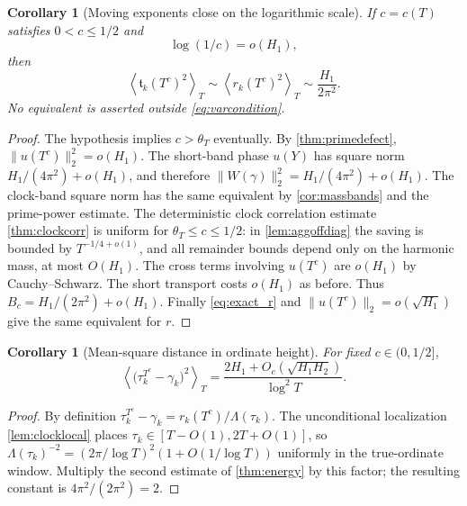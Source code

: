\documentclass[11pt,reqno]{amsart}
\numberwithin{equation}{section}
\newtheorem{corollary}[theorem]{Corollary}
\newcommand{\av}[1]{\left\langle #1\right\rangle_T}
\begin{document}
\begin{corollary}[Moving exponents close on the logarithmic scale]
\label{cor:varenergy}
If $c=c(T)$ satisfies $0<c\le1/2$ and
\begin{equation}\label{eq:varcondition}
\log(1/c)=o(H_1),
\end{equation}
then
\begin{equation}\label{eq:varenergy}
\av{\mathfrak t_k(T^c)^2}
\sim\av{r_k(T^c)^2}
\sim\frac{H_1}{2\pi^2}.
\end{equation}
No equivalent is asserted outside \eqref{eq:varcondition}.
\end{corollary}
\begin{proof}
The hypothesis implies $c>\theta_T$ eventually.
By \cref{thm:primedefect}, $\|u(T^c)\|_2^2=o(H_1)$.
The short-band phase $u(Y)$ has square norm
$H_1/(4\pi^2)+o(H_1)$, and therefore
$\|W(\gamma)\|_2^2=H_1/(4\pi^2)+o(H_1)$.
The clock-band square norm has the same equivalent by
\cref{cor:massbands} and the prime-power estimate.
The deterministic clock correlation estimate
\cref{thm:clockcorr} is uniform for $\theta_T\le c\le1/2$:
in \cref{lem:aggoffdiag} the saving is bounded by
$T^{-1/4+o(1)}$, and all remainder bounds depend only on the
harmonic mass, at most $O(H_1)$.
The cross terms involving $u(T^c)$ are $o(H_1)$ by
Cauchy--Schwarz.  The short transport costs $o(H_1)$ as before.
Thus $B_c=H_1/(2\pi^2)+o(H_1)$.
Finally \eqref{eq:exact_r} and $\|u(T^c)\|_2=o(\sqrt{H_1})$
give the same equivalent for $r$.
\end{proof}

\begin{corollary}[Mean-square distance in ordinate height]
\label{cor:heightdistance}
For fixed $c\in(0,1/2]$,
\begin{equation}\label{eq:heightdistance}
\av{\bigl(\tau_k^{T^c}-\gamma_k\bigr)^2}
=\frac{2H_1+O_c(\sqrt{H_1H_2})}{\log^2T}.
\end{equation}
\end{corollary}
\begin{proof}
By definition
$\tau_k^{T^c}-\gamma_k=r_k(T^c)/\Lambda(\tau_k)$.
The unconditional localization \cref{lem:clocklocal} places $\tau_k\in[T-O(1),2T+O(1)]$,
so $\Lambda(\tau_k)^{-2}
=(2\pi/\log T)^2(1+O(1/\log T))$ uniformly
in the true-ordinate window.  Multiply the second estimate of
\cref{thm:energy} by this factor; the resulting constant is
$4\pi^2/(2\pi^2)=2$.
\end{proof}
\end{document}
